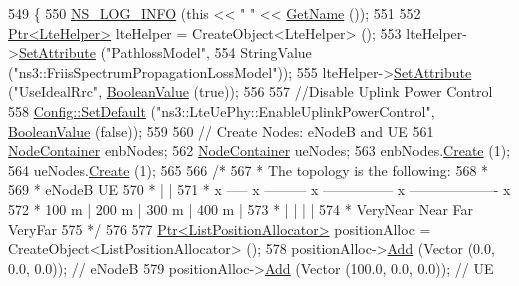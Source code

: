 \begin{DoxyCode}
549 \{
550   \hyperlink{group__logging_gafbd73ee2cf9f26b319f49086d8e860fb}{NS\_LOG\_INFO} (\textcolor{keyword}{this} << \textcolor{stringliteral}{" "} << \hyperlink{classns3_1_1TestCase_a28f7bb59669c24dae1c290fc17fc9b62}{GetName} ());
551 
552   \hyperlink{classns3_1_1Ptr}{Ptr<LteHelper>} lteHelper = CreateObject<LteHelper> ();
553   lteHelper->\hyperlink{classns3_1_1ObjectBase_ac60245d3ea4123bbc9b1d391f1f6592f}{SetAttribute} (\textcolor{stringliteral}{"PathlossModel"},
554                            StringValue (\textcolor{stringliteral}{"ns3::FriisSpectrumPropagationLossModel"}));
555   lteHelper->\hyperlink{classns3_1_1ObjectBase_ac60245d3ea4123bbc9b1d391f1f6592f}{SetAttribute} (\textcolor{stringliteral}{"UseIdealRrc"}, \hyperlink{classns3_1_1BooleanValue}{BooleanValue} (\textcolor{keyword}{true}));
556 
557   \textcolor{comment}{//Disable Uplink Power Control}
558   \hyperlink{group__config_ga2e7882df849d8ba4aaad31c934c40c06}{Config::SetDefault} (\textcolor{stringliteral}{"ns3::LteUePhy::EnableUplinkPowerControl"}, 
      \hyperlink{classns3_1_1BooleanValue}{BooleanValue} (\textcolor{keyword}{false}));
559 
560   \textcolor{comment}{// Create Nodes: eNodeB and UE}
561   \hyperlink{classns3_1_1NodeContainer}{NodeContainer} enbNodes;
562   \hyperlink{classns3_1_1NodeContainer}{NodeContainer} ueNodes;
563   enbNodes.\hyperlink{classns3_1_1NodeContainer_a787f059e2813e8b951cc6914d11dfe69}{Create} (1);
564   ueNodes.\hyperlink{classns3_1_1NodeContainer_a787f059e2813e8b951cc6914d11dfe69}{Create} (1);
565 
566   \textcolor{comment}{/*}
567 \textcolor{comment}{   * The topology is the following:}
568 \textcolor{comment}{   *}
569 \textcolor{comment}{   * eNodeB     UE}
570 \textcolor{comment}{   *    |       |}
571 \textcolor{comment}{   *    x ----- x --------- x --------------- x ------------------- x}
572 \textcolor{comment}{   *      100 m |   200 m   |      300 m      |        400 m        |}
573 \textcolor{comment}{   *            |           |                 |                     |}
574 \textcolor{comment}{   *         VeryNear      Near              Far                 VeryFar}
575 \textcolor{comment}{   */}
576 
577   \hyperlink{classns3_1_1Ptr}{Ptr<ListPositionAllocator>} positionAlloc = CreateObject<ListPositionAllocator> 
      ();
578   positionAlloc->\hyperlink{classns3_1_1ListPositionAllocator_a460e82f015ac012a73ba0ea0cccb3486}{Add} (Vector (0.0, 0.0, 0.0)); \textcolor{comment}{// eNodeB}
579   positionAlloc->\hyperlink{classns3_1_1ListPositionAllocator_a460e82f015ac012a73ba0ea0cccb3486}{Add} (Vector (100.0, 0.0, 0.0)); \textcolor{comment}{// UE}

\end{DoxyCode}
